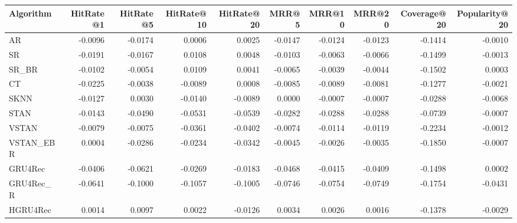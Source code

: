 \begin{tabular}{lrrrrrrrrr}
\toprule
 Algorithm &  HitRate@1 &  HitRate@5 &  HitRate@10 &  HitRate@20 &   MRR@5 &  MRR@10 &  MRR@20 &  Coverage@20 &  Popularity@20 \\
\midrule
        AR &    -0.0096 &    -0.0174 &      0.0006 &      0.0025 & -0.0147 & -0.0124 & -0.0123 &      -0.1414 &        -0.0010 \\
        SR &    -0.0191 &    -0.0167 &      0.0108 &      0.0048 & -0.0103 & -0.0063 & -0.0066 &      -0.1499 &        -0.0013 \\
     SR\_BR &    -0.0102 &    -0.0054 &      0.0109 &      0.0041 & -0.0065 & -0.0039 & -0.0044 &      -0.1502 &         0.0003 \\
        CT &    -0.0225 &    -0.0038 &     -0.0089 &      0.0008 & -0.0085 & -0.0089 & -0.0081 &      -0.1277 &        -0.0021 \\
      SKNN &    -0.0127 &     0.0030 &     -0.0140 &     -0.0089 &  0.0000 & -0.0007 & -0.0007 &      -0.0288 &        -0.0068 \\
      STAN &    -0.0143 &    -0.0490 &     -0.0531 &     -0.0539 & -0.0282 & -0.0288 & -0.0288 &      -0.0739 &        -0.0007 \\
     VSTAN &    -0.0079 &    -0.0075 &     -0.0361 &     -0.0402 & -0.0074 & -0.0114 & -0.0119 &      -0.2234 &        -0.0012 \\
 VSTAN\_EBR &     0.0004 &    -0.0286 &     -0.0234 &     -0.0342 & -0.0045 & -0.0026 & -0.0035 &      -0.1850 &        -0.0007 \\
   GRU4Rec &    -0.0406 &    -0.0621 &     -0.0269 &     -0.0183 & -0.0468 & -0.0415 & -0.0409 &      -0.1498 &         0.0002 \\
 GRU4Rec\_R &    -0.0641 &    -0.1000 &     -0.1057 &     -0.1005 & -0.0746 & -0.0754 & -0.0749 &      -0.1754 &        -0.0431 \\
  HGRU4Rec &     0.0014 &     0.0097 &      0.0022 &     -0.0126 &  0.0034 &  0.0026 &  0.0016 &      -0.1378 &        -0.0029 \\
\bottomrule
\end{tabular}
